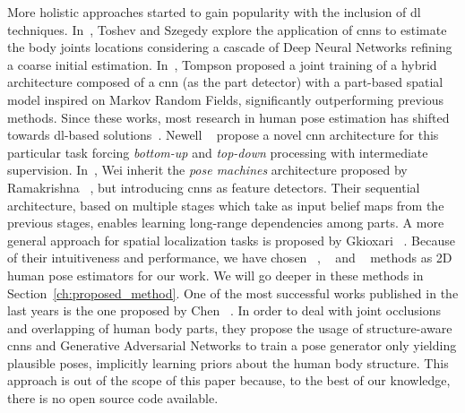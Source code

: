 More holistic approaches started to gain popularity with the inclusion of \gls{dl} techniques. In~\cite{Toshev2014-ou}, Toshev and Szegedy explore the application of \glspl{cnn} to estimate the body joints locations considering a cascade of Deep Neural Networks refining a coarse initial estimation. 
In~\cite{Tompson2014-iq}, Tompson \etal proposed a joint training of a hybrid architecture composed of a \gls{cnn} (as the part detector) with a part-based spatial model inspired on Markov Random Fields, 
significantly outperforming previous methods. Since these works, most research in human pose estimation has shifted towards \gls{dl}-based solutions~\cite{Fan2015-zt, Bulat2016-in, Lifshitz2016-sg, Carreira2016-uk, Chu2017-io, Chen2017-pd, Yang2017-ao, Belagiannis2017-mf, Ke2018-xw, Newell2016-cy, Insafutdinov2016-ek, Wei2016-rb}. Newell \etal~\cite{Newell2016-cy} propose a novel \gls{cnn} architecture for this particular task forcing \textit{bottom-up} and \textit{top-down} processing with intermediate supervision. In~\cite{Wei2016-rb}, Wei \etal inherit the \textit{pose machines} architecture proposed by Ramakrishna \etal~\cite{Ramakrishna2014-ul}, but introducing \glspl{cnn} as feature detectors. Their sequential architecture, based on multiple stages which take as input belief maps from the previous stages, enables learning long-range dependencies among parts. A more general approach for spatial localization tasks is proposed by Gkioxari \etal~\cite{Gkioxari2016-ix}. Because of their intuitiveness and performance, we have chosen ~\cite{Newell2016-cy}, ~\cite{Wei2016-rb} and ~\cite{Gkioxari2016-ix} methods as 2D human pose estimators for our work. We will go deeper in these methods in Section~\ref{ch:proposed_method}. One of the most successful works published in the last years is the one proposed by Chen \etal~\cite{Chen2017-pd}. In order to deal with joint occlusions and overlapping of human body parts, they propose the usage of structure-aware \glspl{cnn} and Generative Adversarial Networks to train a pose generator only yielding plausible poses, implicitly learning priors about the human body structure. This approach is out of the scope of this paper because, to the best of our knowledge, there is no open source code available.

